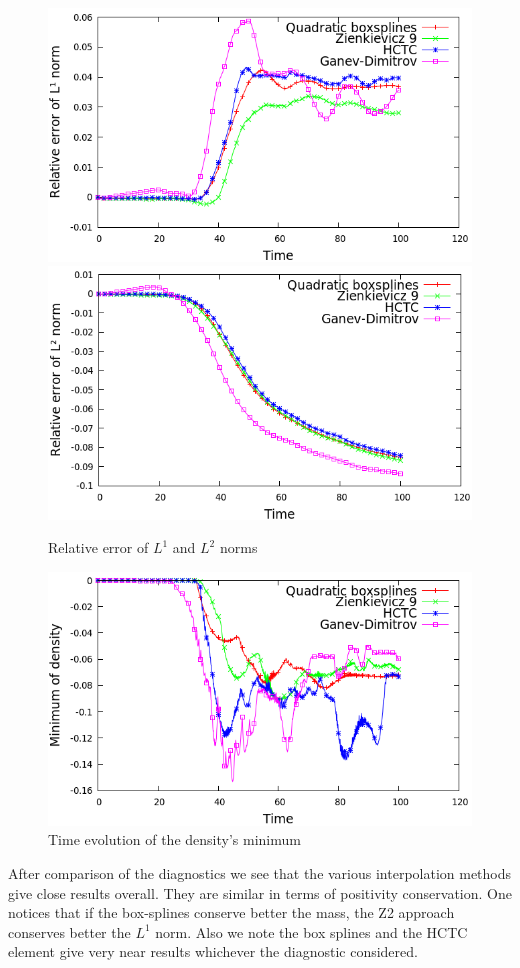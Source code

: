 \documentclass[proc]{edpsmath}
\begin{document}
\begin{figure}[h!]
	\includegraphics[scale=0.3]{figures/l1norm_cg.png}
	\includegraphics[scale=0.3]{figures/l2norm_cg.png}
	\caption{Relative error of $L^1$ and $L^2$ norms}
\end{figure}


\begin{figure}[h!]
	\includegraphics[scale=0.4]{figures/min_cg.png}
	\caption{Time evolution of the density's minimum}
\end{figure}
After comparison of the diagnostics we see that the various interpolation methods give close results overall. They are similar in terms of positivity conservation. One notices that if the box-splines conserve better the mass, the Z2 approach conserves better the $L^1$ norm. Also we note the box splines and the HCTC element give very near results whichever the diagnostic considered.  
\end{document}
